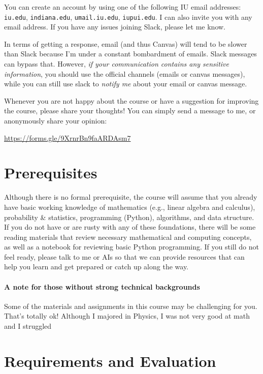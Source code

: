 \documentclass[11pt,article,oneside]{memoir} %
\begin{document}
You can create an account by using one of the following IU email addresses: \texttt{iu.edu}, \texttt{indiana.edu}, \texttt{umail.iu.edu}, \texttt{iupui.edu}.
I can also invite you with any email address. 
If you have any issues joining Slack, please let me know.

In terms of getting a response, email (and thus Canvas) will tend to be slower than Slack because I'm under a constant bombardment of emails. Slack messages can bypass that. However, \emph{if your communication contains any sensitive information}, you should use the official channels (emails or canvas messages), while you can still use slack to \emph{notify me} about your email or canvas message. 

Whenever you are not happy about the course or have a suggestion for improving the course, please share your thoughts! You can simply send a message to me, or anonymously share your opinion:

\url{https://forms.gle/9XrnrBn9faARDAsm7}

\section{Prerequisites} %

Although there is no formal prerequisite, the course will assume that you already have basic working knowledge of mathematics (e.g., linear algebra and calculus), probability \& statistics, programming (Python), algorithms, and data structure. 
If you do not have or are rusty with any of these foundations, there will be some reading materials that review necessary mathematical and computing concepts, as well as a notebook for reviewing basic Python programming. 
If you still do not feel ready, please talk to me or AIs so that we can provide resources that can help you learn and get prepared or catch up along the way. 

\paragraph{A note for those without strong technical backgrounds} Some of the materials and assignments in this course may be challenging for you. That's totally ok! Although I majored in Physics, I was not very good at math and I struggled 

\section{Requirements and Evaluation} %
\end{document}
